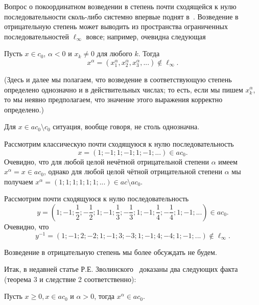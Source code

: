 Вопрос о покоординатном возведении в степень почти сходящейся к нулю последовательности сколь-либо системно впервые поднят в~\cite{zvol2022ac}.
Возведение в отрицательную степень может выводить из пространства ограниченных последовательностей $\ell_\infty$ вовсе;
например, очевидна следующая
\begin{lemma}
	Пусть $x\in c_0$, $\alpha< 0$ и $x_k\ne 0 $ для любого $k$.
	Тогда
	\begin{equation*}
		x^\alpha = (x_1^\alpha,x_2^\alpha,x_3^\alpha,...) \notin \ell_\infty
		.
	\end{equation*}
\end{lemma}
(Здесь и далее мы полагаем, что возведение в соответствующую степень определено однозначно и в действительных числах;
то есть, если мы пишем $x_k^\alpha$, то мы неявно предполагаем, что значение этого выражения корректно определено.)


Для $x\in ac_0\setminus c_0$ ситуация, вообще говоря, не столь однозначна.

\begin{example}
	\label{example:ac0_pow_signum_classic}
	Рассмотрим классическую почти сходящуюся к нулю последовательность
	\begin{equation}
		x = (1;-1;1;-1;1;-1;...) \in ac_0
		.
	\end{equation}
	Очевидно, что для любой целой нечётной отрицательной степени $\alpha$ имеем $x^\alpha = x \in ac_0$,
	однако для любой целой чётной отрицательной степени $\alpha$ мы получаем $x^\alpha = (1;1;1;1;1;1;...) \in ac \setminus ac_0$.
\end{example}

\begin{example}
	Рассмотрим почти сходящуюся к нулю последовательность
	\begin{equation}
		y = \left(1;-1;\frac12;-\frac12;1;-1;\frac13;-\frac13;1;-1;\frac14;-\frac14;1;-1;...\right) \in ac_0
		.
	\end{equation}
	Очевидно, что
	\begin{equation}
		y^{-1} = \left(1;-1;2;-2;1;-1;3;-3;1;-1;4;-4;1;-1;...\right)  \notin \ell_\infty
		.
	\end{equation}
\end{example}

Возведение в отрицательную степень мы более обсуждать не будем.

Итак, в недавней статье Р.Е. Зволинского~\cite{zvol2022ac} доказаны два следующих факта (теорема 3 и следствие 2 соответственно):
\begin{theorem}
	\label{thm:Zvol_pow_pos}
	Пусть $x \geqslant 0, x \in a c_0$ и $\alpha>0$, тогда $x^\alpha \in a c_0$.
\end{theorem}

